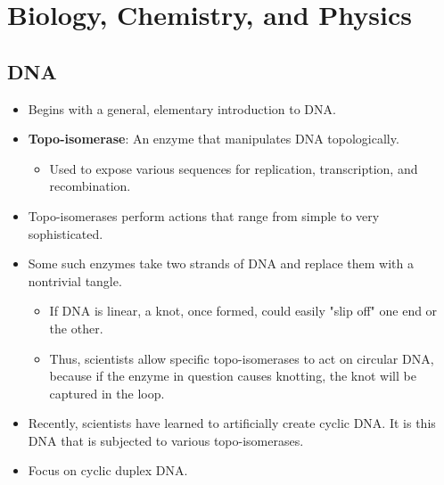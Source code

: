 \documentclass[titlepage]{article}
\numberwithin{figure}{section}
\numberwithin{table}{section}
\numberwithin{equation}{section}
\begin{document}
\section{Biology, Chemistry, and Physics}\label{sse:biochemphys}
\subsection{DNA}
\begin{itemize}
    \item Begins with a general, elementary introduction to DNA.
    \item \textbf{Topo-isomerase}: An enzyme that manipulates DNA topologically.
    \begin{itemize}
        \item Used to expose various sequences for replication, transcription, and recombination.
    \end{itemize}
    \item Topo-isomerases perform actions that range from simple to very sophisticated.
    \item Some such enzymes take two strands of DNA and replace them with a nontrivial tangle.
    \begin{itemize}
        \item If DNA is linear, a knot, once formed, could easily "slip off" one end or the other.
        \item Thus, scientists allow specific topo-isomerases to act on circular DNA, because if the enzyme in question causes knotting, the knot will be captured in the loop.
    \end{itemize}
    \item Recently, scientists have learned to artificially create cyclic DNA. It is this DNA that is subjected to various topo-isomerases.
    \item Focus on cyclic duplex DNA.
    \begin{figure}[h!]
        \centering
        \vspace{2.3em}
\end{figure}
\end{itemize}
\end{document}

